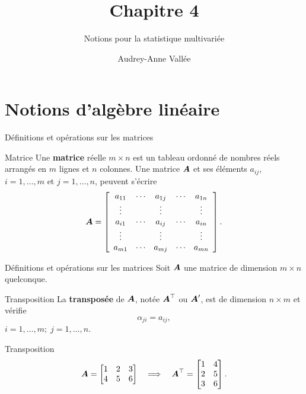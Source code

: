 \documentclass{BeamerAAV}
\title{Chapitre 4}
\subtitle{Notions pour la statistique multivariée}
\institute{STT-2100 Régression}
\author{Audrey-Anne Vallée}
\begin{document}
\AtBeginSection{\frame{\sectionpage}}

\begin{frame}[plain]
	\titlepage
\end{frame}


\section{Notions d'algèbre linéaire}


\begin{frame}{Définitions et opérations sur les matrices}
\begin{bte}{Matrice}
Une \textbf{matrice} réelle $m\times n$ est un tableau ordonné de nombres réels arrangés en $m$ lignes et $n$ colonnes. 
Une matrice $\mbox{\boldmath$A$\unboldmath}$ et ses éléments $a_{ij}$, $i = 1, \dots, m$ et $j=1, \dots, n$, peuvent s'écrire
$$
\mbox{\boldmath$A$\unboldmath}=\left[ \begin{array}{ccccc}
a_{11} & \cdots & a_{1j} & \cdots & a_{1n} \\
\vdots &         & \vdots &           & \vdots \\
a_{i1} &  \cdots       &  a_{ij} & \cdots & a_{in} \\
\vdots &         & \vdots &           & \vdots \\
a_{m1} &  \cdots & a_{mj}& \cdots & a_{mn}
\end{array}
\right].
$$
\end{bte}    
\end{frame}

\begin{frame}{Définitions et opérations sur les matrices}
Soit $\mbox{\boldmath$A$\unboldmath}$ une matrice de dimension $m\times n$ quelconque.
    \begin{bte}{Transposition}
      La \textbf{transposée} de $\mbox{\boldmath$A$\unboldmath}$, notée $\mbox{\boldmath$A$\unboldmath}^\top$ ou $\mbox{\boldmath$A$\unboldmath}'$, est de dimension $n\times m$ et vérifie $$\alpha_{ji}=a_{ij},$$ $i=1,\ldots,m; \; j=1,\ldots,n.$
    \end{bte}
\begin{exe}{Transposition}
    \[
\mbox{\boldmath$A$\unboldmath}=
\begin{bmatrix}
1&2&3\\4&5&6
\end{bmatrix}
\quad\Longrightarrow\quad
\mbox{\boldmath$A$\unboldmath}^\top=
\begin{bmatrix}
1&4\\2&5\\3&6
\end{bmatrix}.
\]
\end{exe}
\end{frame}
\end{document}
